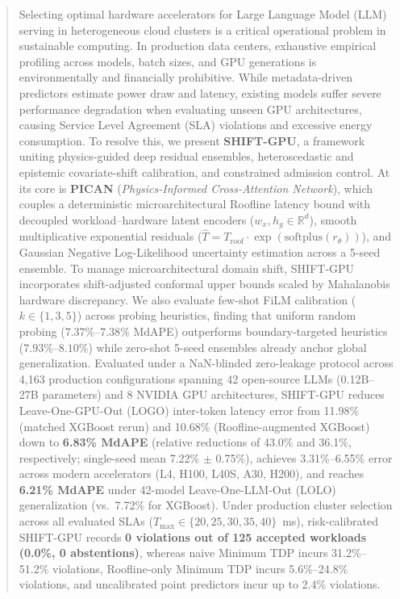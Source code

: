 \documentclass[preprint,12pt]{elsarticle}
\begin{document}
\begin{frontmatter}
\begin{abstract}
Selecting optimal hardware accelerators for Large Language Model (LLM) serving in heterogeneous cloud clusters is a critical operational problem in sustainable computing. In production data centers, exhaustive empirical profiling across models, batch sizes, and GPU generations is environmentally and financially prohibitive. While metadata-driven predictors estimate power draw and latency, existing models suffer severe performance degradation when evaluating unseen GPU architectures, causing Service Level Agreement (SLA) violations and excessive energy consumption. To resolve this, we present \textbf{SHIFT-GPU}, a framework uniting physics-guided deep residual ensembles, heteroscedastic and epistemic covariate-shift calibration, and constrained admission control. At its core is \textbf{PICAN} (\textit{Physics-Informed Cross-Attention Network}), which couples a deterministic microarchitectural Roofline latency bound with decoupled workload--hardware latent encoders ($w_x, h_g \in \mathbb{R}^d$), smooth multiplicative exponential residuals ($\hat{T} = T_{\text{roof}} \cdot \exp(\mathrm{softplus}(r_\theta))$), and Gaussian Negative Log-Likelihood uncertainty estimation across a 5-seed ensemble. To manage microarchitectural domain shift, SHIFT-GPU incorporates shift-adjusted conformal upper bounds scaled by Mahalanobis hardware discrepancy. We also evaluate few-shot FiLM calibration ($k \in \{1, 3, 5\}$) across probing heuristics, finding that uniform random probing ($7.37\%$--$7.38\%$ MdAPE) outperforms boundary-targeted heuristics ($7.93\%$--$8.10\%$) while zero-shot 5-seed ensembles already anchor global generalization. Evaluated under a NaN-blinded zero-leakage protocol across 4,163 production configurations spanning 42 open-source LLMs (0.12B--27B parameters) and 8 NVIDIA GPU architectures, SHIFT-GPU reduces Leave-One-GPU-Out (LOGO) inter-token latency error from 11.98\% (matched XGBoost rerun) and 10.68\% (Roofline-augmented XGBoost) down to \textbf{6.83\% MdAPE} (relative reductions of 43.0\% and 36.1\%, respectively; single-seed mean 7.22\% $\pm$ 0.75\%), achieves 3.31\%--6.55\% error across modern accelerators (L4, H100, L40S, A30, H200), and reaches \textbf{6.21\% MdAPE} under 42-model Leave-One-LLM-Out (LOLO) generalization (vs.\ 7.72\% for XGBoost). Under production cluster selection across all evaluated SLAs ($T_{\max} \in \{20, 25, 30, 35, 40\}$~ms), risk-calibrated SHIFT-GPU records \textbf{0 violations out of 125 accepted workloads (0.0\%, 0 abstentions)}, whereas naive Minimum TDP incurs 31.2\%--51.2\% violations, Roofline-only Minimum TDP incurs 5.6\%--24.8\% violations, and uncalibrated point predictors incur up to 2.4\% violations.
\end{abstract}


\end{frontmatter}
\end{document}
